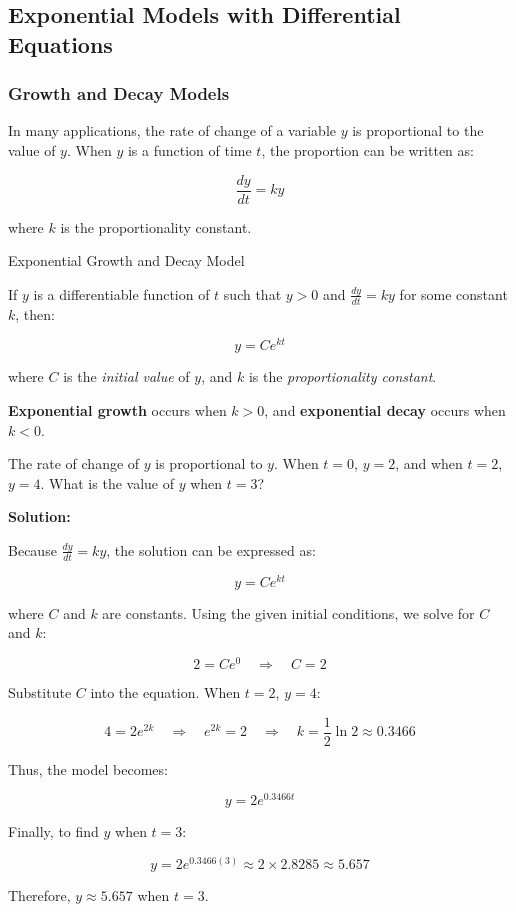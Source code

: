 \documentclass[12pt]{article}
\theoremstyle{beautifulthm}
\begin{document}
\newpage

\subsection{Exponential Models with Differential Equations}

\subsubsection{Growth and Decay Models}
In many applications, the rate of change of a variable $y$ is proportional to the value of $y$. When $y$ is a function of time $t$, the proportion can be written as:

\[
\frac{dy}{dt} = ky
\]

\noindent where $k$ is the proportionality constant.


\begin{mytheorem}{Exponential Growth and Decay Model}{}


If $y$ is a differentiable function of $t$ such that $y > 0$ and $\frac{dy}{dt} = ky$ for some constant $k$, then:

\[
y = Ce^{kt}
\]

\noindent where $C$ is the \textit{initial value} of $y$, and $k$ is the \textit{proportionality constant}. 

\textbf{Exponential growth} occurs when $k > 0$, and \textbf{exponential decay} occurs when $k < 0$.
\end{mytheorem}

\begin{tcolorbox}[colback=examplebg, colframe=red!75!black, title=\textbf{EXAMPLE 1: Using an Exponential Growth Model }, fonttitle=\bfseries, sharp corners]

The rate of change of $y$ is proportional to $y$. When $t = 0$, $y = 2$, and when $t = 2$, $y = 4$. What is the value of $y$ when $t = 3$?

\tcblower
\textbf{Solution:} 

Because $\frac{dy}{dt} = ky$, the solution can be expressed as:

\[
y = Ce^{kt}
\]

where $C$ and $k$ are constants. Using the given initial conditions, we solve for $C$ and $k$:

\[
2 = Ce^0 \quad \Rightarrow \quad C = 2
\]

Substitute $C$ into the equation. When $t = 2$, $y = 4$:

\[
4 = 2e^{2k} \quad \Rightarrow \quad e^{2k} = 2 \quad \Rightarrow \quad k = \frac{1}{2} \ln 2 \approx 0.3466
\]

Thus, the model becomes:

\[
y = 2e^{0.3466t}
\]

Finally, to find $y$ when $t = 3$:

\[
y = 2e^{0.3466(3)} \approx 2 \times 2.8285 \approx 5.657
\]

Therefore, $y \approx 5.657$ when $t = 3$.



\end{tcolorbox}
\end{document}
